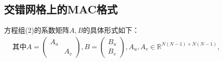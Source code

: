 \documentclass{article}
\begin{document}
\subsection{交错网格上的MAC格式}
方程组(2)的系数矩阵$A,B$的具体形式如下：\\
$
  \begin{aligned}
    &\text{其中}A=
    \begin{pmatrix}
    A_{u} & \\
    & A_{v}
    \end{pmatrix},B=
    \begin{pmatrix}
    B_{u} \\
    B_{v}
    \end{pmatrix},A_{u},A_{v}\in\mathbb{R}^{N(N-1)\times N(N-1)}, \\
  \end{aligned}
$
\end{document}
